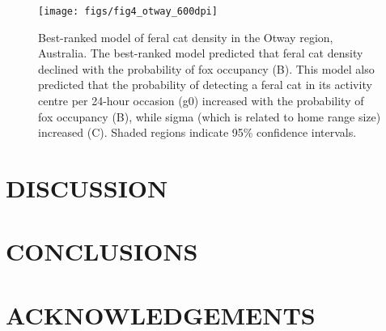 \documentclass[]{elsarticle} %
\begin{document}
\begin{figure}
\texttt{[image: figs/fig4\_otway\_600dpi]} \caption{Best-ranked model of feral cat density in the Otway region, Australia. The best-ranked model predicted that feral cat density declined with the probability of fox occupancy (B). This model also predicted that the probability of detecting a feral cat in its activity centre per 24-hour occasion (g0) increased with the probability of fox occupancy (B), while sigma (which is related to home range size) increased (C). Shaded regions indicate 95\% confidence intervals.}\label{fig:oplots}
\end{figure}

\newpage

\hypertarget{discussion}{%
\section{DISCUSSION}\label{discussion}}

\newpage

\hypertarget{conclusions}{%
\section{CONCLUSIONS}\label{conclusions}}

\newpage

\hypertarget{acknowledgements}{%
\section{ACKNOWLEDGEMENTS}\label{acknowledgements}}
\end{document}
